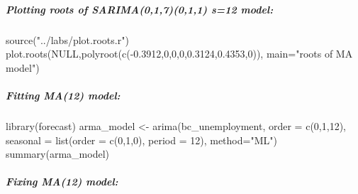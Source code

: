 \documentclass[
  letterpaper,
  DIV=11,
  numbers=noendperiod]{scrartcl}
\let\oldsubparagraph\subparagraph
\renewcommand{\subparagraph}[1]{\oldsubparagraph{#1}\mbox{}}
\newenvironment{Shaded}{\begin{snugshade}}{\end{snugshade}}
\newcommand{\AttributeTok}[1]{\textcolor[rgb]{0.40,0.45,0.13}{#1}}
\newcommand{\ConstantTok}[1]{\textcolor[rgb]{0.56,0.35,0.01}{#1}}
\newcommand{\DecValTok}[1]{\textcolor[rgb]{0.68,0.00,0.00}{#1}}
\newcommand{\FloatTok}[1]{\textcolor[rgb]{0.68,0.00,0.00}{#1}}
\newcommand{\FunctionTok}[1]{\textcolor[rgb]{0.28,0.35,0.67}{#1}}
\newcommand{\NormalTok}[1]{\textcolor[rgb]{0.00,0.23,0.31}{#1}}
\newcommand{\OtherTok}[1]{\textcolor[rgb]{0.00,0.23,0.31}{#1}}
\newcommand{\SpecialCharTok}[1]{\textcolor[rgb]{0.37,0.37,0.37}{#1}}
\newcommand{\StringTok}[1]{\textcolor[rgb]{0.13,0.47,0.30}{#1}}
\begin{document}
\hypertarget{plotting-roots-of-sarima017011-s12-model}{%
\subparagraph{Plotting roots of SARIMA(0,1,7)(0,1,1) s=12
model:}\label{plotting-roots-of-sarima017011-s12-model}}

\begin{Shaded}
\begin{Highlighting}[]
\FunctionTok{source}\NormalTok{(}\StringTok{"../labs/plot.roots.r"}\NormalTok{)}
\FunctionTok{plot.roots}\NormalTok{(}\ConstantTok{NULL}\NormalTok{,}\FunctionTok{polyroot}\NormalTok{(}\FunctionTok{c}\NormalTok{(}\SpecialCharTok{{-}}\FloatTok{0.3912}\NormalTok{,}\DecValTok{0}\NormalTok{,}\DecValTok{0}\NormalTok{,}\DecValTok{0}\NormalTok{,}\FloatTok{0.3124}\NormalTok{,}\FloatTok{0.4353}\NormalTok{,}\DecValTok{0}\NormalTok{)), }\AttributeTok{main=}\StringTok{"roots of MA model"}\NormalTok{)}
\end{Highlighting}
\end{Shaded}

\hypertarget{fitting-ma12-model}{%
\subparagraph{Fitting MA(12) model:}\label{fitting-ma12-model}}

\begin{Shaded}
\begin{Highlighting}[]
\FunctionTok{library}\NormalTok{(forecast)}
\NormalTok{arma\_model }\OtherTok{\textless{}{-}} \FunctionTok{arima}\NormalTok{(bc\_unemployment, }\AttributeTok{order =} \FunctionTok{c}\NormalTok{(}\DecValTok{0}\NormalTok{,}\DecValTok{1}\NormalTok{,}\DecValTok{12}\NormalTok{), }\AttributeTok{seasonal =} \FunctionTok{list}\NormalTok{(}\AttributeTok{order =} \FunctionTok{c}\NormalTok{(}\DecValTok{0}\NormalTok{,}\DecValTok{1}\NormalTok{,}\DecValTok{0}\NormalTok{), }\AttributeTok{period =} \DecValTok{12}\NormalTok{), }\AttributeTok{method=}\StringTok{"ML"}\NormalTok{)}
\FunctionTok{summary}\NormalTok{(arma\_model)}
\end{Highlighting}
\end{Shaded}

\hypertarget{fixing-ma12-model}{%
\subparagraph{Fixing MA(12) model:}\label{fixing-ma12-model}}
\end{document}
